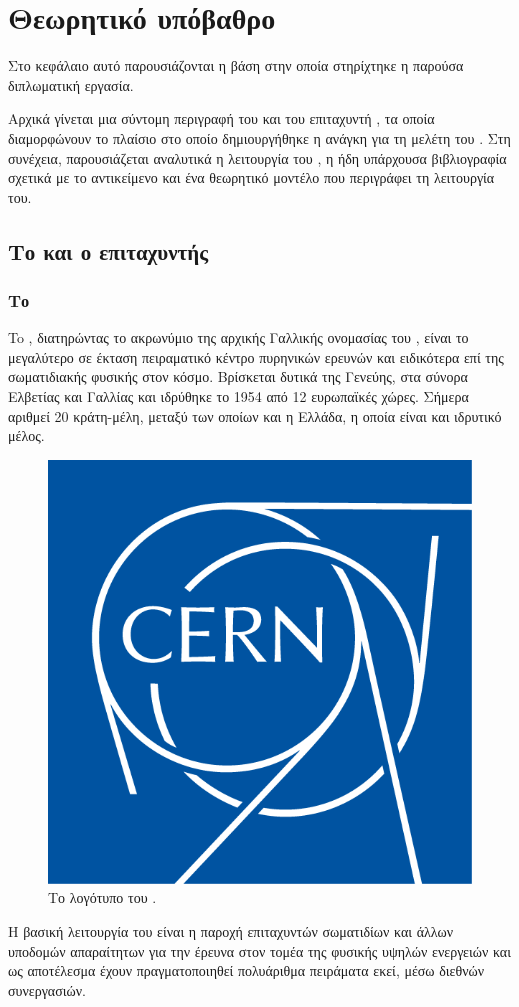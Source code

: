 \chapter{Θεωρητικό υπόβαθρο} \label{ch:theoretical-background}
Στο κεφάλαιο αυτό παρουσιάζονται η βάση στην οποία στηρίχτηκε η παρούσα διπλωματική εργασία.

Αρχικά γίνεται μια σύντομη περιγραφή του  και του επιταχυντή , τα οποία διαμορφώνουν το πλαίσιο στο οποίο δημιουργήθηκε η ανάγκη για τη μελέτη του . 
Στη συνέχεια, παρουσιάζεται αναλυτικά η λειτουργία του , η ήδη υπάρχουσα βιβλιογραφία σχετικά με το αντικείμενο και ένα θεωρητικό μοντέλο που περιγράφει τη λειτουργία του. 


\section{Το  και ο επιταχυντής }



\subsection{Το }

To , διατηρώντας το ακρωνύμιο της αρχικής Γαλλικής ονομασίας του , είναι το μεγαλύτερο σε έκταση πειραματικό κέντρο πυρηνικών ερευνών και ειδικότερα επί της σωματιδιακής φυσικής στον κόσμο. 
Βρίσκεται δυτικά της Γενεύης, στα σύνορα Ελβετίας και Γαλλίας και ιδρύθηκε το 1954 από 12 ευρωπαϊκές χώρες. 
Σήμερα αριθμεί 20 κράτη-μέλη, μεταξύ των οποίων και η Ελλάδα, η οποία είναι και ιδρυτικό μέλος.

\begin{figure}[tph]
\includegraphics[width=0.25\linewidth]{images/CERNlogo}
\centering
\caption{Το λογότυπο του .}
\label{img:CERNlogo}
\end{figure}

Η βασική λειτουργία του  είναι η παροχή επιταχυντών σωματιδίων και άλλων υποδομών απαραίτητων για την έρευνα στον τομέα της φυσικής υψηλών ενεργειών και ως αποτέλεσμα έχουν πραγματοποιηθεί πολυάριθμα πειράματα εκεί, μέσω διεθνών συνεργασιών.

